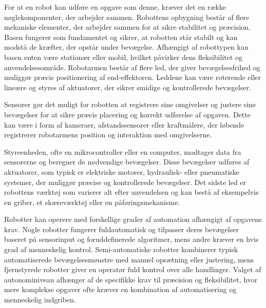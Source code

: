 For at en robot kan udføre en opgave som denne, kræver det en række nøglekomponenter, der arbejder sammen. Robottens opbygning består af flere mekaniske elementer, der arbejder sammen for at sikre stabilitet og præcision. Basen fungerer som fundamentet og sikrer, at robotten står stabilt og kan modstå de kræfter, der opstår under bevægelse. Afhængigt af robottypen kan basen enten være stationær eller mobil, hvilket påvirker dens fleksibilitet og anvendelsesområde. Robotarmen består af flere led, der giver bevægelsesfrihed og muliggør præcis positionering af end-effektoren. Leddene kan være roterende eller lineære og styres af aktuatorer, der sikrer smidige og kontrollerede bevægelser. 

Sensorer gør det muligt for robotten at registrere sine omgivelser og justere sine bevægelser for at sikre præcis placering og korrekt udførelse af opgaven. Dette kan være i form af kameraer, afstandssensorer eller kraftmålere, der løbende registrerer robotarmens position og interaktion med omgivelserne. 

Styreenheden, ofte en mikrocontroller eller en computer, modtager data fra sensorerne og beregner de nødvendige bevægelser. Disse bevægelser udføres af aktuatorer, som typisk er elektriske motorer, hydraulisk- eller pneumatiske systemer, der muliggør præcise og kontrollerede bevægelser. Det sidste led er  robottens værktøj som varierer alt efter anvendelsen og kan bestå af eksempelvis en griber, et skæreværktøj eller en påføringsmekanisme.\parencite{TextbookofRobotics}

Robotter kan operere med forskellige grader af automation afhængigt af opgavens krav. Nogle robotter fungerer fuldautomatisk og tilpasser deres bevægelser baseret på sensorinput og foruddefinerede algoritmer, mens andre kræver en hvis grad af menneskelig kontrol. Semi-automatiske robotter kombinerer typisk automatiserede bevægelsesmønstre med manuel opsætning eller justering, mens fjernstyrede robotter giver en operatør fuld kontrol over alle handlinger. Valget af autonominiveau afhænger af de specifikke krav til præcision og fleksibilitet, hvor mere komplekse opgaver ofte kræver en kombination af automatisering og menneskelig indgriben.\parencite{BasicsofRobotics}